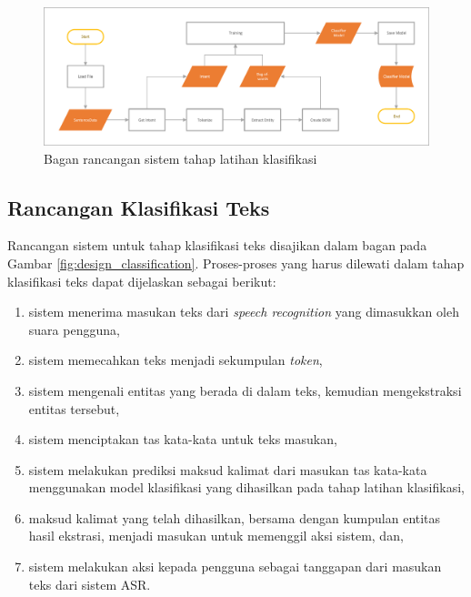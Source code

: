 \begin{figure}[H]
	\centering
	\includegraphics[width=\textwidth, trim=2 2 2 2, clip]{resources/3/design_training.pdf}
	\caption{Bagan rancangan sistem tahap latihan klasifikasi}
	\label{fig:design_training}
\end{figure}

\subsection{Rancangan Klasifikasi Teks}

Rancangan sistem untuk tahap klasifikasi teks disajikan dalam bagan pada Gambar \ref{fig:design_classification}. Proses-proses yang harus dilewati dalam tahap klasifikasi teks dapat dijelaskan sebagai berikut:

\begin{enumerate}
	\item sistem menerima masukan teks dari \textit{speech recognition} yang dimasukkan oleh suara pengguna,
	\item sistem memecahkan teks menjadi sekumpulan \textit{token},
	\item sistem mengenali entitas yang berada di dalam teks, kemudian mengekstraksi entitas tersebut,
	\item sistem menciptakan tas kata-kata untuk teks masukan,
	\item sistem melakukan prediksi maksud kalimat dari masukan tas kata-kata menggunakan model klasifikasi yang dihasilkan pada tahap latihan klasifikasi,
	\item maksud kalimat yang telah dihasilkan, bersama dengan kumpulan entitas hasil ekstrasi, menjadi masukan untuk memenggil aksi sistem, dan,
	\item sistem melakukan aksi kepada pengguna sebagai tanggapan dari masukan teks dari sistem ASR.
\end{enumerate}

